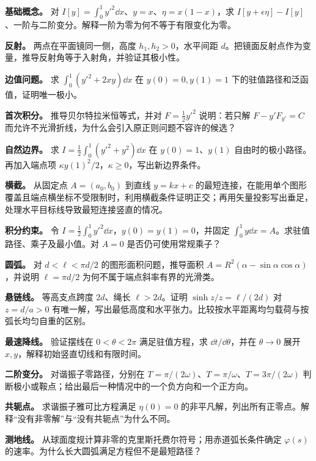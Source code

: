 \begin{bookexercises}
\item {} \textbf{基础概念。} 对 $I[y]=\int_0^1y'^2\dd x$、$y=x$、$\eta=x(1-x)$，求 $I[y+\epsilon\eta]-I[y]$、一阶与二阶变分。解释一阶为零为何不等于有限变化为零。
\item {} \textbf{反射。} 两点在平面镜同一侧，高度 $h_1,h_2>0$，水平间距 $d$。把镜面反射点作为变量，推导反射角等于入射角，并验证其极小性。
\item {} \textbf{边值问题。} 求 $\int_0^1(y'^2+2xy)\dd x$ 在 $y(0)=0,y(1)=1$ 下的驻值路径和泛函值，证明唯一极小。
\item {} \textbf{首次积分。} 推导贝尔特拉米恒等式，并对 $F=\tfrac12 y'^2$ 说明：若只解 $F-y'F_{y'}=C$ 而允许不光滑折线，为什么会引入原正则问题不容许的候选？
\item {} \textbf{自然边界。} 求 $I=\tfrac12\int_0^1(y'^2+y^2)\dd x$ 在 $y(0)=1$、$y(1)$ 自由时的极小路径。再加入端点项 $\kappa y(1)^2/2$，$\kappa\ge0$，写出新边界条件。
\item {} \textbf{横截。} 从固定点 $A=(a_0,b_0)$ 到直线 $y=kx+c$ 的最短连接，在能用单个图形覆盖且端点横坐标不受限制时，利用横截条件证明正交；再用矢量投影写出垂足，处理水平目标线导致最短连接竖直的情况。
\item {} \textbf{积分约束。} 令 $I=\tfrac12\int_0^1y'^2\dd x$，$y(0)=y(1)=0$，并固定 $\int_0^1y\dd x=A$。求驻值路径、乘子及最小值。对 $A=0$ 是否仍可使用常规乘子？
\item {} \textbf{圆弧。} 对 $d<\ell<\pi d/2$ 的图形面积问题，推导面积 $A=R^2(\alpha-\sin\alpha\cos\alpha)$，并说明 $\ell=\pi d/2$ 为何不属于端点斜率有界的光滑类。
\item {} \textbf{悬链线。} 等高支点跨度 $2d$、绳长 $\ell>2d$。证明 $\sinh z/z=\ell/(2d)$ 对 $z=d/a>0$ 有唯一解，写出最低高度和水平张力。比较按水平距离均匀载荷与按弧长均匀自重的区别。
\item {} \textbf{最速降线。} 验证摆线在 $0<\theta<2\pi$ 满足驻值方程，求 $\dd t/\dd\theta$，并在 $\theta\to0$ 展开 $x,y$，解释初始竖直切线和有限时间。
\item {} \textbf{二阶变分。} 对谐振子零路径，分别在 $T=\pi/(2\omega)$、$T=\pi/\omega$、$T=3\pi/(2\omega)$ 判断极小或鞍点；给出最后一种情况中的一个负方向和一个正方向。
\item {} \textbf{共轭点。} 求谐振子雅可比方程满足 $\eta(0)=0$ 的非平凡解，列出所有正零点。解释“没有非零解”与“没有共轭点”为什么不同。
\item {} \textbf{测地线。} 从球面度规计算非零的克里斯托费尔符号；用赤道弧长条件确定 $\varphi(s)$ 的速率。为什么长大圆弧满足方程但不是最短路径？

\end{bookexercises}
